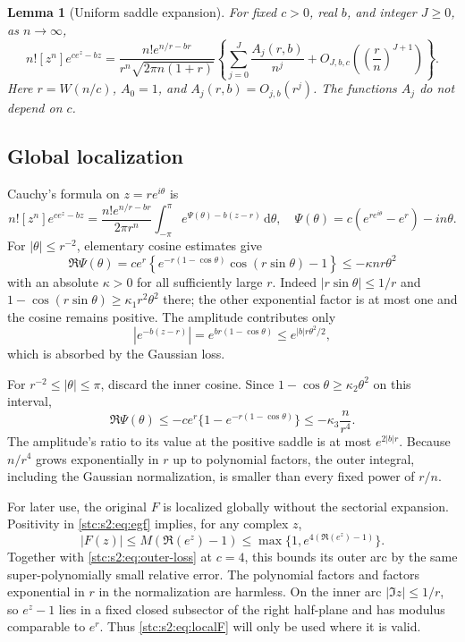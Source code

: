 \documentclass[11pt,letterpaper]{article}
\numberwithin{equation}{section}
\newtheorem{lemma}[theorem]{Lemma}
\theoremstyle{remark}\newtheorem{remark}[theorem]{Remark}
\newcommand{\dd}{\,\mathrm d}
\begin{document}
\begin{lemma}[Uniform saddle expansion]\label{stc:s2:lem:saddle}
For fixed $c>0$, real $b$, and integer $J\ge0$, as $n\to\infty$,
\begin{equation}\label{stc:s2:eq:saddle-lemma}
 n![z^n]e^{ce^z-bz}
 =\frac{n!e^{n/r-br}}{r^n\sqrt{2\pi n(1+r)}}
 \left\{\sum_{j=0}^J\frac{A_j(r,b)}{n^j}
 +O_{J,b,c}\left(\left(\frac rn\right)^{J+1}\right)\right\}.
\end{equation}
Here $r=W(n/c)$, $A_0=1$, and $A_j(r,b)=O_{j,b}(r^j)$. The functions $A_j$ do not depend on $c$.
\end{lemma}

\subsection{Global localization}
Cauchy's formula on $z=re^{i\theta}$ is
\begin{equation}\label{stc:s2:eq:cauchy}
 n![z^n]e^{ce^z-bz}
 =\frac{n!e^{n/r-br}}{2\pi r^n}
 \int_{-\pi}^{\pi}e^{\Psi(\theta)-b(z-r)}\dd\theta,
 \quad \Psi(\theta)=c(e^{re^{i\theta}}-e^r)-in\theta.
\end{equation}
For $|\theta|\le r^{-2}$, elementary cosine estimates give
\begin{equation}\label{stc:s2:eq:inner-loss}
 \Re\Psi(\theta)
 =ce^r\left\{e^{-r(1-\cos\theta)}\cos(r\sin\theta)-1\right\}
 \le-\kappa nr\theta^2
\end{equation}
with an absolute $\kappa>0$ for all sufficiently large $r$. Indeed $|r\sin\theta|\le1/r$ and $1-\cos(r\sin\theta)\ge\kappa_1r^2\theta^2$ there; the other exponential factor is at most one and the cosine remains positive. The amplitude contributes only
\[
 |e^{-b(z-r)}|=e^{br(1-\cos\theta)}\le e^{|b|r\theta^2/2},
\]
which is absorbed by the Gaussian loss.

For $r^{-2}\le|\theta|\le\pi$, discard the inner cosine. Since $1-\cos\theta\ge\kappa_2\theta^2$ on this interval,
\begin{equation}\label{stc:s2:eq:outer-loss}
 \Re\Psi(\theta)\le
 -ce^r\{1-e^{-r(1-\cos\theta)}\}
 \le-\kappa_3\frac n{r^4}.
\end{equation}
The amplitude's ratio to its value at the positive saddle is at most $e^{2|b|r}$. Because $n/r^4$ grows exponentially in $r$ up to polynomial factors, the outer integral, including the Gaussian normalization, is smaller than every fixed power of $r/n$.

For later use, the original $F$ is localized globally without the sectorial expansion. Positivity in \eqref{stc:s2:eq:egf} implies, for any complex $z$,
\begin{equation}\label{stc:s2:eq:Fglobal}
 |F(z)|\le M(\Re(e^z)-1)
 \le\max\{1,e^{4(\Re(e^z)-1)}\}.
\end{equation}
Together with \eqref{stc:s2:eq:outer-loss} at $c=4$, this bounds its outer arc by the same super-polynomially small relative error. The polynomial factors and factors exponential in $r$ in the normalization are harmless. On the inner arc $|\Im z|\le1/r$, so $e^z-1$ lies in a fixed closed subsector of the right half-plane and has modulus comparable to $e^r$. Thus \eqref{stc:s2:eq:localF} will only be used where it is valid.
\end{document}
